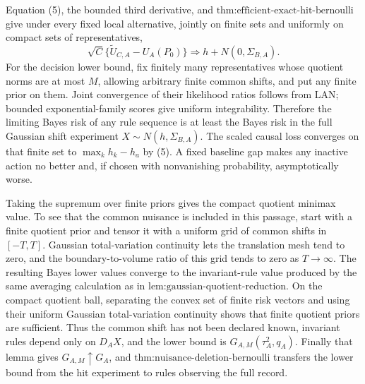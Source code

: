 Equation (5), the bounded third derivative, and \(\text{thm:efficient-exact-hit-bernoulli}\) give under every fixed local alternative, jointly on finite sets and uniformly on compact sets of representatives,
\[
\sqrt C\{\widetilde U_{C,A}-U_A(P_0)\}\Rightarrow
h+N(0,\Sigma_{B,A}). \tag{8}
\]
For the decision lower bound, fix finitely many representatives whose quotient norms are at most \(M\), allowing arbitrary finite common shifts, and put any finite prior on them.  Joint convergence of their likelihood ratios follows from LAN; bounded exponential-family scores give uniform integrability.  Therefore the limiting Bayes risk of any rule sequence is at least the Bayes risk in the full Gaussian shift experiment \(X\sim N(h,\Sigma_{B,A})\).  The scaled causal loss converges on that finite set to \(\max_kh_k-h_a\) by (5).  A fixed baseline gap makes any inactive action no better and, if chosen with nonvanishing probability, asymptotically worse.

Taking the supremum over finite priors gives the compact quotient minimax value.  To see that the common nuisance is included in this passage, start with a finite quotient prior and tensor it with a uniform grid of common shifts in \([-T,T]\).  Gaussian total-variation continuity lets the translation mesh tend to zero, and the boundary-to-volume ratio of this grid tends to zero as \(T\to\infty\).  The resulting Bayes lower values converge to the invariant-rule value produced by the same averaging calculation as in \(\text{lem:gaussian-quotient-reduction}\).  On the compact quotient ball, separating the convex set of finite risk vectors and using their uniform Gaussian total-variation continuity shows that finite quotient priors are sufficient.  Thus the common shift has not been declared known, invariant rules depend only on \(D_AX\), and the lower bound is \(G_{A,M}(\tau_A^2,q_A)\).  Finally that lemma gives \(G_{A,M}\uparrow G_A\), and \(\text{thm:nuisance-deletion-bernoulli}\) transfers the lower bound from the hit experiment to rules observing the full record.